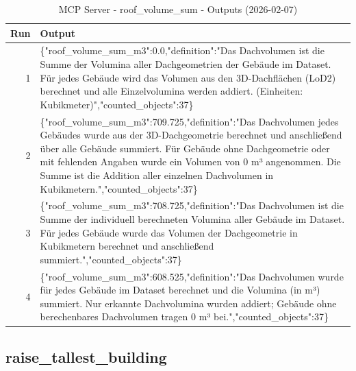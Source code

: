 \documentclass[a4paper,11pt]{article}
\begin{document}
\begin{table}[ht]
\centering
\scriptsize
\caption{MCP Server - roof\_volume\_sum - Outputs (2026-02-07)}
\label{tab:mcp\_roof\_volume\_sum\_outputs\_2026-02-07}
\begin{tabular}{r p{12cm}}
\hline
Run & Output \\
\hline
1 & \{"roof\_volume\_sum\_m3":0.0,"definition":"Das Dachvolumen ist die Summe der Volumina aller Dachgeometrien der Gebäude im Dataset. Für jedes Gebäude wird das Volumen aus den 3D-Dachflächen (LoD2) berechnet und alle Einzelvolumina werden addiert. (Einheiten: Kubikmeter)","counted\_objects":37\} \\
2 & \{"roof\_volume\_sum\_m3":709.725,"definition":"Das Dachvolumen jedes Gebäudes wurde aus der 3D-Dachgeometrie berechnet und anschließend über alle Gebäude summiert. Für Gebäude ohne Dachgeometrie oder mit fehlenden Angaben wurde ein Volumen von 0 m³ angenommen. Die Summe ist die Addition aller einzelnen Dachvolumen in Kubikmetern.","counted\_objects":37\} \\
3 & \{"roof\_volume\_sum\_m3":708.725,"definition":"Das Dachvolumen ist die Summe der individuell berechneten Volumina aller Gebäude im Dataset. Für jedes Gebäude wurde das Volumen der Dachgeometrie in Kubikmetern berechnet und anschließend summiert.","counted\_objects":37\} \\
4 & \{"roof\_volume\_sum\_m3":608.525,"definition":"Das Dachvolumen wurde für jedes Gebäude im Dataset berechnet und die Volumina (in m³) summiert. Nur erkannte Dachvolumina wurden addiert; Gebäude ohne berechenbares Dachvolumen tragen 0 m³ bei.","counted\_objects":37\} \\
\hline
\end{tabular}
\end{table}

\clearpage
\subsection{raise\_tallest\_building}
\end{document}
